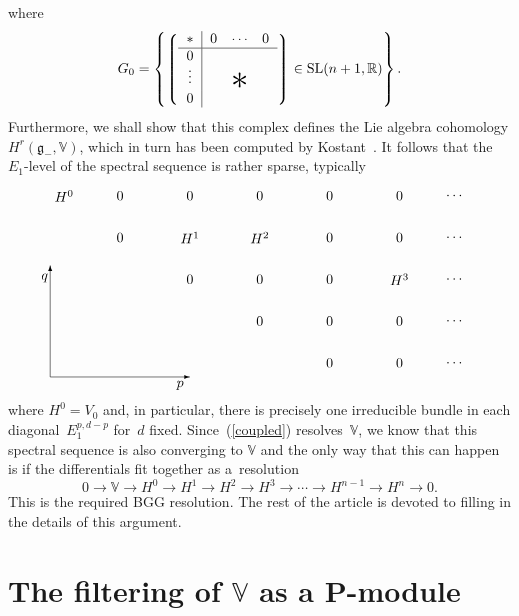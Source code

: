\documentclass[pdftex]{sigma}
\begin{document}
\noindent
where
\[G_0=\left\{
\left\lgroup\begin{tabular}{c|ccc}$\ast$&$0$&$\!\cdots\!$&$0$\\ \hline
$0$\\
\raisebox{2pt}[15pt]{$\vdots$}&&
\raisebox{-2pt}[0pt][0pt]{\makebox[0pt]{\Huge$\ast$}}\\
$0$\end{tabular}\right\rgroup\in{\mathrm{SL}}(n+1,{\mathbb{R}})\right\}.\]
Furthermore, we shall show that this complex def\/ines the Lie algebra
cohomology $H^r({\mathfrak{g}}_-,{\mathbb{V}})$, which in turn has been
computed by Kostant~\cite{k}. It follows that the $E_1$-level of the spectral
sequence is rather sparse, typically
\begin{equation}\label{sparse}\raisebox{-70pt}{\begin{picture}(300,148)(0,10)
\put(0,20){\vector(1,0){100}}
\put(0,20){\vector(0,1){80}}
\put(93,14){\makebox(0,0){$p$}}
\put(-4,91){\makebox(0,0){$q$}}
\put(10,150){\makebox(0,0){$H^0$}}
\put(50,150){\makebox(0,0){$0$}}
\put(100,150){\makebox(0,0){$0$}}
\put(150,150){\makebox(0,0){$0$}}
\put(200,150){\makebox(0,0){$0$}}
\put(250,150){\makebox(0,0){$0$}}
\put(290,150){\makebox(0,0){$\cdots$}}
\put(290,120){\makebox(0,0){$\cdots$}}
\put(290,90){\makebox(0,0){$\cdots$}}
\put(290,60){\makebox(0,0){$\cdots$}}
\put(290,30){\makebox(0,0){$\cdots$}}
\put(50,120){\makebox(0,0){$0$}}
\put(100,120){\makebox(0,0){$H^1$}}
\put(150,120){\makebox(0,0){$H^2$}}
\put(200,120){\makebox(0,0){$0$}}
\put(250,120){\makebox(0,0){$0$}}
\put(100,90){\makebox(0,0){$0$}}
\put(150,90){\makebox(0,0){$0$}}
\put(200,90){\makebox(0,0){$0$}}
\put(250,90){\makebox(0,0){$H^3$}}
\put(150,60){\makebox(0,0){$0$}}
\put(200,60){\makebox(0,0){$0$}}
\put(250,60){\makebox(0,0){$0$}}
\put(200,30){\makebox(0,0){$0$}}
\put(250,30){\makebox(0,0){$0$}}
\end{picture}}\end{equation}
where $H^0=V_0$ and, in particular, there is precisely one irreducible bundle
in each diagonal~$E_1^{p,d-p}$ for~$d$ f\/ixed. Since~(\ref{coupled})
resolves~${\mathbb{V}}$, we know that this spectral sequence is also converging
to ${\mathbb{V}}$ and the only way that this can happen is if the dif\/ferentials
f\/it together as a~resolution
\[0\to{\mathbb{V}}
\to H^0\to H^1\to H^2\to H^3\to\cdots\to H^{n-1}\to H^n\to 0.\]
This is the required BGG resolution. The rest of the article is devoted to
f\/illing in the details of this argument.

\section[The filtering of ${\mathbb{V}}$ as a $P$-module]{The f\/iltering of $\boldsymbol{{\mathbb{V}}}$ as a $\boldsymbol{P}$-module}\label{filtering}
\end{document}
